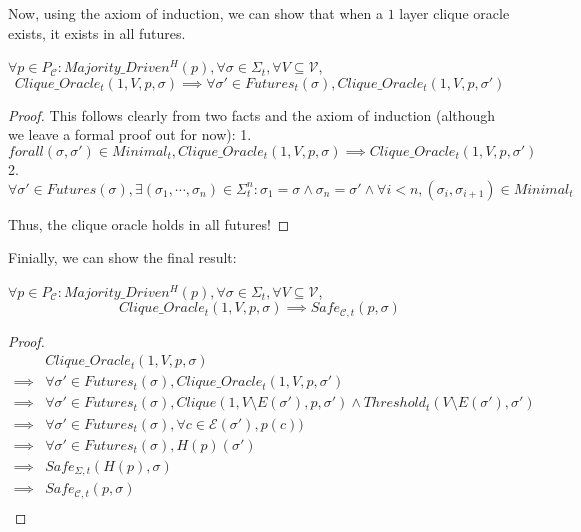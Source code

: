 Now, using the axiom of induction, we can show that when a $1$ layer clique oracle exists, it exists in all futures.


\begin{lemma}
$\forall p \in P_{\mathcal{C}} : Majority\_Driven^H(p), \forall \sigma \in \Sigma_t, \forall V \subseteq \mathcal{V}$,
$$
Clique\_Oracle_t(1, V, p, \sigma) \implies \forall \sigma' \in Futures_t(\sigma), Clique\_Oracle_t(1, V, p, \sigma')
$$
\end{lemma}

\begin{proof}
This follows clearly from two facts and the axiom of induction (although we leave a formal proof out for now):
1. $forall (\sigma, \sigma') \in Minimal_t, Clique\_Oracle_t(1, V, p, \sigma) \implies Clique\_Oracle_t(1, V, p, \sigma')$
2. $\forall \sigma' \in Futures(\sigma), \exists (\sigma_1, \cdots , \sigma_{n}) \in \Sigma_t^n : \sigma_1 = \sigma \land \sigma_n = \sigma' \land \forall i < n, (\sigma_i, \sigma_{i + 1}) \in Minimal_t$

Thus, the clique oracle holds in all futures!
\end{proof}


Finially, we can show the final result:

\begin{lemma}
$\forall p \in P_{\mathcal{C}} : Majority\_Driven^H(p), \forall \sigma \in \Sigma_t, \forall V \subseteq \mathcal{V}$,
$$
Clique\_Oracle_t(1, V, p, \sigma) \implies Safe_{\mathcal{C},t}(p, \sigma)
$$
\end{lemma}

\begin{proof}
  \begin{align}
    &Clique\_Oracle_t(1, V, p, \sigma) \\
    \implies& \forall \sigma' \in Futures_t(\sigma), Clique\_Oracle_t(1, V, p, \sigma') \\
    \implies& \forall \sigma' \in Futures_t(\sigma), Clique(1, V \setminus E(\sigma'), p, \sigma') \land Threshold_t(V \setminus E(\sigma'), \sigma') \\
    \implies& \forall \sigma' \in Futures_t(\sigma), \forall c \in \mathcal{E}(\sigma'), p(c) ) \\
    \implies& \forall \sigma' \in Futures_t(\sigma), H(p)(\sigma') \\
    \implies& Safe_{\Sigma,t}(H(p), \sigma) \\
    \implies& Safe_{\mathcal{C},t}(p, \sigma) \\
  \end{align}
\end{proof}
